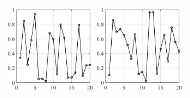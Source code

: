 \documentclass{article}
\begin{document}
\begin{figure}
	\def\CE{0.20}
	\centering
	\includegraphics[height=\CE\textwidth, width=\CE\textwidth]{pic-1.pdf}\label{fig-a}\hfill
	\includegraphics[height=\CE\textwidth, width=\CE\textwidth]{pic-2.pdf}\hfill

\end{figure}
\end{document}
